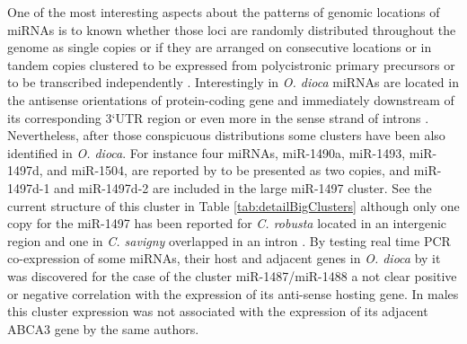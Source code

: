 \documentclass[graybox]{svmult}
\begin{document}
One of the most interesting aspects about the patterns of genomic locations of 
miRNAs is to known whether those loci are randomly distributed throughout the 
genome as single copies or if they are arranged on consecutive locations or in 
tandem copies clustered to be expressed from polycistronic primary precursors 
or to be transcribed independently \cite{TanzerALL:2010}. Interestingly in 
\textit{O. dioca} miRNAs are located in the antisense orientations of 
protein-coding gene and immediately downstream of its corresponding 3`UTR region 
or even more in the sense strand of introns \cite{Fu2008}. Nevertheless, after 
those conspicuous distributions some clusters have been also identified in 
\textit{O. dioca}. For instance four miRNAs, miR-1490a, miR-1493, miR-1497d, and 
miR-1504, are reported by \cite{Fu2008} to be presented as two copies, and 
miR-1497d-1 and miR-1497d-2 are included in the large miR-1497 cluster. See the 
current structure of this cluster in Table \ref{tab:detailBigClusters} although 
only one copy for the miR-1497 has been reported for \textit{C. robusta} 
located in an intergenic region \cite{Fu2008, Hendrix2010} and one in 
\textit{C. savigny} overlapped in an intron \cite{Fu2008}. By testing real time 
PCR co-expression of some miRNAs, their host and adjacent genes in \textit{O. 
dioca} by \cite{Fu2008} it was discovered for the case of the cluster  
miR-1487/miR-1488 a not clear positive or negative correlation with the 
expression of its anti-sense hosting gene. In males this cluster expression was 
not associated with the expression of its adjacent ABCA3 gene by the same 
authors.  
\end{document}
